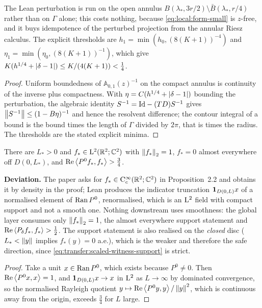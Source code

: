 The Lean perturbation is run on the open annulus $B(\lambda_*,3r/2)\setminus\bar
B(\lambda_*,r/4)$ rather than on $\Gamma$ alone; this costs nothing, because
\eqref{eq:local:form-small} is $z$-free, and it buys idempotence of the perturbed
projection from the annular Riesz calculus.  The explicit thresholds are
$h_1=\min(h_0,(8(K+1))^{-4})$ and $\eta_1=\min(\eta_0,(8(K+1))^{-1})$, which give
$K(h^{1/4}+\left\lvert\delta-1\right\rvert)\leq K/(4(K+1))<\tfrac14$.

\begin{proof}
  \leanok
  Uniform boundedness of $\mathbb A_{0,1}(z)^{-1}$ on the compact annulus is continuity of
  the inverse plus compactness.  With $\eta=C(h^{1/4}+\left\lvert\delta-1\right\rvert)$ bounding the
  perturbation, the algebraic identity $S^{-1}=\mathrm{Id}-(TD)S^{-1}$ gives
  $\left\|S^{-1}\right\|\leq(1-B\eta)^{-1}$ and hence the resolvent difference; the contour
  integral of a bound is the bound times the length of $\Gamma$ divided by $2\pi$, that is
  times the radius.  The thresholds are the stated explicit minima.
\end{proof}

\begin{lemma}
  \label{lem:local:witness}
  \leanok
  There are $L_*>0$ and $f_*\in\mathrm{L}^2(\mathbb{R}^2;\mathbb{C}^2)$ with $\left\|f_*\right\|_2=1$, $f_*=0$ almost
  everywhere off $D(0,L_*)$, and $\operatorname{Re}\left\langle P^0f_*,f_*\right\rangle>\tfrac34$.
\end{lemma}

\textbf{Deviation.}  The paper asks for $f_*\in\mathrm{C}_c^\infty(\mathbb{R}^2;\mathbb{C}^2)$ in Proposition~2.2
and obtains it by density in the proof; Lean produces
the indicator truncation $\mathbf{1}_{D(0,L)}x$ of a normalised element of $\operatorname{Ran} P^0$,
renormalised, which is an $\mathrm{L}^2$ field with compact support and not a smooth one.  Nothing
downstream uses smoothness: the global layer consumes only $\left\|f_*\right\|_2=1$, the almost
everywhere support statement and $\operatorname{Re}\left\langle P_\delta f_*,f_*\right\rangle>\tfrac12$.  The support
statement is also realised on the \emph{closed} disc ($L_*<\left\|y\right\|$ implies $f_*(y)=0$
a.e.), which is the weaker and therefore the safe direction, since
\eqref{eq:transfer:scaled-witness-support} is strict.

\begin{proof}
  \leanok
  Take a unit $x\in\operatorname{Ran} P^0$, which exists because $P^0\neq0$.  Then
  $\operatorname{Re}\left\langle P^0x,x\right\rangle=1$, and $\mathbf{1}_{D(0,L)}x\to x$ in $\mathrm{L}^2$ as $L\to\infty$ by dominated
  convergence, so the normalised Rayleigh quotient
  $y\mapsto\operatorname{Re}\left\langle P^0y,y\right\rangle/\left\|y\right\|^2$, which is continuous away from the origin, exceeds
  $\tfrac34$ for $L$ large.
\end{proof}

